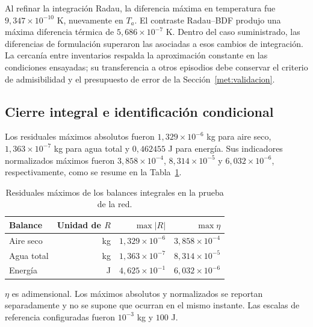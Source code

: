Al refinar la integración Radau, la diferencia máxima en temperatura fue $9{,}347\times10^{-10}$ K, nuevamente en $T_a$. El contraste Radau--BDF produjo una máxima diferencia térmica de $5{,}686\times10^{-7}$ K. Dentro del caso suministrado, las diferencias de formulación superaron las asociadas a esos cambios de integración. La cercanía entre inventarios respalda la aproximación constante en las condiciones ensayadas; su transferencia a otros episodios debe conservar el criterio de admisibilidad y el presupuesto de error de la Sección~\ref{met:validacion}.

\subsection{Cierre integral e identificación condicional}

Los residuales máximos absolutos fueron $1{,}329\times10^{-6}$ kg para aire seco, $1{,}363\times10^{-7}$ kg para agua total y $0{,}462455$ J para energía. Sus indicadores normalizados máximos fueron $3{,}858\times10^{-4}$, $8{,}314\times10^{-5}$ y $6{,}032\times10^{-6}$, respectivamente, como se resume en la Tabla~\ref{tab:res_red_balances}.

\begin{table}[htbp]
\centering
\caption{Residuales máximos de los balances integrales en la prueba de la red.}
\label{tab:res_red_balances}
\small
\setlength{\tabcolsep}{5pt}
\begin{tabular}{lrrr}
\toprule
Balance & Unidad de $R$ & $\max|R|$ & $\max\eta$ \\
\midrule
Aire seco & kg & $1{,}329\times10^{-6}$ & $3{,}858\times10^{-4}$ \\
Agua total & kg & $1{,}363\times10^{-7}$ & $8{,}314\times10^{-5}$ \\
Energía & J & $4{,}625\times10^{-1}$ & $6{,}032\times10^{-6}$ \\
\bottomrule
\end{tabular}
\par\vspace{3pt}
\begin{minipage}{0.98\textwidth}\footnotesize
$\eta$ es adimensional. Los máximos absolutos y normalizados se reportan separadamente y no se supone que ocurran en el mismo instante. Las escalas de referencia configuradas fueron $10^{-3}$ kg y $100$ J.
\end{minipage}
\end{table}


